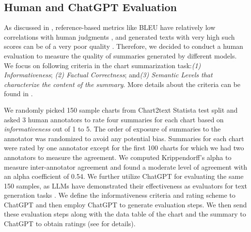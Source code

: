 \subsection{Human and ChatGPT Evaluation}
\label{subsec:summary_eval}

As discussed in , reference-based metrics like BLEU 
have relatively low correlations with human judgments \cite{belz-reiter-2006-comparing,tan-etal-2015-awkward,liu2023geval}, and generated texts with very high such scores can be of a very poor quality \cite{smith-etal-2016-climbing}. 
Therefore, we decided to conduct a human evaluation to measure the quality of summaries generated by different models. We focus on following criteria in the chart summarization task:\emph{(1) Informativeness}; \emph{(2) Factual Correctness}; and\emph{(3) Semantic Levels that characterize the content of the summary}. More details about the criteria can be found in .

We randomly picked 150 sample charts from Chart2text Statista test split and asked  3 human annotators to rate four summaries for each chart based on \textit{informativeness} out of 1 to 5.  The order of exposure of summaries to the annotator was randomized to avoid any potential bias. Summaries for each chart were rated by one annotator except for the first 100 charts for which we had two annotators to measure the agreement. 
We computed  Krippendorff’s alpha \cite{Krippendorff2011ComputingKA} to measure inter-annotator agreement and found a moderate level of agreement with an alpha coefficient of 0.54. 
We further utilize ChatGPT for evaluating the same 150 samples, as LLMs have demonstrated their effectiveness as evaluators for text generation tasks \cite{luo2023chatgpt, liu2023geval, gao2023humanlike, fu2023gptscore}. We define the informativeness criteria and rating scheme to ChatGPT and then employ ChatGPT to generate evaluation steps. We then send these evaluation steps along with the data table of the chart and the summary to ChatGPT to obtain ratings (see   for details). 

